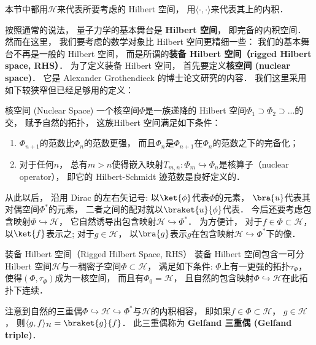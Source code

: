 
本节中都用$\mathcal{H}$来代表所要考虑的 Hilbert 空间， 用$\langle\cdot,\cdot\rangle$来代表其上的内积． 

按照通常的说法， 量子力学的基本舞台是 \textbf{Hilbert 空间}， 即完备的内积空间． 然而在这里， 我们要考虑的数学对象比 Hilbert 空间更精细一些： 我们的基本舞台不再是一般的 Hilbert 空间， 而是所谓的\textbf{装备 Hilbert 空间（rigged Hilbert space, RHS）}． 为了定义装备 Hilbert 空间， 首先要定义\textbf{核空间 (nuclear space)}． 它是 Alexander Grothendieck 的博士论文研究的内容． 我们这里采用如下较狭窄但已经足够用的定义：

\begin{definition}{核空间 (Nuclear Space)}
一个核空间$\Phi$是一族递降的 Hilbert 空间$\Phi_1\supset\Phi_2\supset...$的交， 赋予自然的拓扑， 这族Hilbert 空间满足如下条件：
\begin{enumerate}
\item $\Phi_{n+1}$的范数比$\Phi_n$的范数更强， 而且$\Phi_n$是$\Phi_{n+1}$在$\Phi_n$的范数之下的完备化；
\item 对于任何$n$， 总有$m>n$使得嵌入映射$T_{m,n}:\Phi_{m}\hookrightarrow\Phi_n$是核算子（nuclear operator）， 即它的 Hilbert-Schmidt 迹范数是良好定义的．
\end{enumerate}
\end{definition}

    从此以后， 沿用 Dirac 的左右矢记号: 以$\ket{\phi}$代表$\Phi$的元素， $\bra{u}$代表其对偶空间$\Phi^*$的元素， 二者之间的配对就以$\braket{u}{\phi}$代表． 今后还要考虑包含映射$\Phi\hookrightarrow\mathcal{H}$， 它自然诱导出包含映射$\mathcal{H}\hookrightarrow\Phi^*$． 为方便计， 对于$f\in\Phi\subset\mathcal{H}$， 以$\ket{f}$表示之; 对于$g\in\mathcal{H}$， 以$\bra{g}$表示$g$在包含映射$\mathcal{H}\hookrightarrow\Phi^*$下的像．

\begin{definition}{装备 Hilbert 空间（Rigged Hilbert Space, RHS）}
装备 Hilbert 空间包含一可分 Hilbert 空间$\mathcal{H}$与一稠密子空间$\Phi\subset\mathcal{H}$， 满足如下条件: $\Phi$上有一更强的拓扑$\tau_\Phi$， 使得$(\Phi,\tau_\Phi)$成为一核空间， 而且有$\Phi_0=\mathcal{H}$， 且自然的包含映射$\Phi\hookrightarrow\mathcal{H}$在此拓扑下连续．
\end{definition}

    注意到自然的三重偶$\Phi\hookrightarrow\mathcal{H}\hookrightarrow\Phi^*$与$\mathcal{H}$的内积相容， 即如果$f\in\Phi\subset\mathcal{H}$， $g\in\mathcal{H}$， 则$\langle g,f\rangle_{\mathcal{H}}=\braket{g}{f}$． 此三重偶称为 \textbf{Gelfand 三重偶 (Gelfand triple)}．

